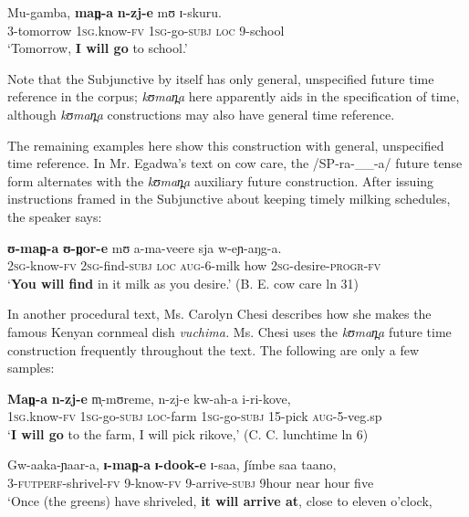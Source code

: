 \documentclass[output=paper]{langsci/langscibook}
\begin{document}
\ea\label{ex:sarvasy:20}
\gll Mu-gamba,   \textbf{man̪-a}    \textbf{n-zj-e}    mʊ  ɪ{}-skuru. \\
3-tomorrow  \textsc{1sg.}know-\textsc{fv}  \textsc{1sg}{}-go-\textsc{subj}  \textsc{loc}  9-school \\
\glt ‘Tomorrow, \textbf{I will go} to school.’
\z

Note that the Subjunctive by itself has only general, unspecified future time reference in the corpus; \textit{kʊman̪a }here apparently aids in the specification of time, although \textit{kʊman̪a }constructions may also have general time reference. 

The remaining examples here show this construction with general, unspecified time reference. In Mr. Egadwa’s text on cow care, the /SP-ra-\_\_-a/ future tense form alternates with the \textit{kʊman̪a }auxiliary future construction. After issuing instructions framed in the Subjunctive about keeping timely milking schedules, the speaker says: 

\ea\label{ex:sarvasy:21}
\gll \textbf{ʊ{}-man̪-a}   \textbf{ʊ{}-n̪or-e}     mʊ   a-ma-veere   sja   w-eɲ-aŋg-a. \\
\textsc{2sg-}know-\textsc{fv}  \textsc{2sg}{}-find-\textsc{subj}  \textsc{loc}  \textsc{aug-}6-milk  how  \textsc{2sg}{}-desire-\textsc{progr}{}-\textsc{fv} \\
\glt ‘\textbf{You will find} in it milk as you desire.’ (B. E. cow care ln 31)
\z

In another procedural text, Ms. Carolyn Chesi describes how she makes the famous Kenyan cornmeal dish \textit{vuchima. }Ms. Chesi uses the \textit{kʊman̪a }future time construction frequently throughout the text. The following are only a few samples:

\ea\label{ex:sarvasy:22}
\gll \textbf{Man̪-a}     \textbf{n-zj-e}     m̩-mʊreme,   n-zj-e     kw-ah-a     i-ri-kove, \\
\textsc{1sg}.know-\textsc{fv}  \textsc{1sg}{}-go-\textsc{subj}  \textsc{loc}{}-farm  \textsc{1sg}{}-go-\textsc{subj}  15-pick    \textsc{aug}{}-5-veg.sp \\
\glt ‘\textbf{I will go} to the farm, I will pick rikove,’ (C. C. lunchtime ln 6)
\z

\ea\label{ex:sarvasy:23}
\gll Gw-aaka-ɲaar-a,   \textbf{ɪ{}-man̪-a}   \textbf{ɪ{}-dook-e}   ɪ{}-saa,   ʃ\'{i}mbe   saa   taano, \\
3-\textsc{futperf-}shrivel-\textsc{fv}  9-know-\textsc{fv}  9-arrive-\textsc{subj}    9hour    near  hour  five \\
\glt ‘Once (the greens) have shriveled, \textbf{it will arrive at}, close to eleven o’clock,
\end{document}
